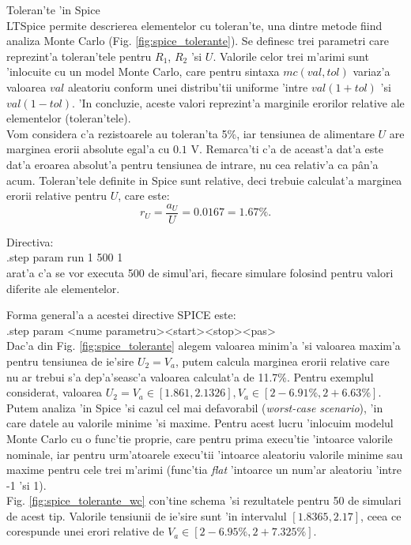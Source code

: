 \begin{definition}[facultativ] Toleran'te 'in Spice\\
LTSpice permite descrierea elementelor cu toleran'te, una dintre metode fiind analiza Monte Carlo (Fig. \ref{fig:spice_tolerante}). Se definesc trei parametri care reprezint'a toleran'tele pentru $R_1$, $R_2$ 'si $U$. Valorile celor trei m'arimi sunt 'inlocuite cu un model Monte Carlo, care pentru sintaxa $mc(val,tol)$ variaz'a valoarea $val$ aleatoriu conform unei distribu'tii uniforme 'intre $val(1+tol)$ 'si $val(1-tol)$. 'In concluzie, aceste valori reprezint'a marginile erorilor relative ale elementelor (toleran'tele).\\

Vom considera c'a rezistoarele au toleran'ta 5\%, iar tensiunea de alimentare $U$ are marginea erorii absolute egal'a cu $0.1$ V. Remarca'ti c'a de aceast'a dat'a este dat'a eroarea absolut'a pentru tensiunea de intrare, nu cea relativ'a ca p\^an'a acum. Toleran'tele definite in Spice sunt relative, deci trebuie calculat'a marginea erorii relative pentru $U$, care este:
\begin{equation*} 
r_U = \frac{a_U}{U} = 0.0167 = 1.67\%.
\end{equation*}

Directiva:\\
.step param run 1 500 1 \\
arat'a c'a se vor executa 500 de simul'ari, fiecare simulare folosind pentru valori diferite ale elementelor. 

Forma general'a a acestei directive SPICE este: \\
.step param \textless nume parametru\textgreater \textless start\textgreater \textless stop\textgreater \textless pas\textgreater\\

Dac'a din Fig. \ref{fig:spice_tolerante} alegem valoarea minim'a 'si valoarea maxim'a pentru tensiunea de ie'sire $U_2 = V_a$, putem calcula marginea erorii relative care nu ar trebui s'a dep'a'seasc'a valoarea calculat'a de 11.7\%.
Pentru exemplul considerat, valoarea $U_2 = V_a \in [1.861, 2.1326], V_a \in \left[2-6.91\%, 2+6.63\%\right]$.\\

Putem analiza 'in Spice 'si cazul cel mai defavorabil (\textit{worst-case scenario}), 'in care datele au valorile minime 'si maxime. Pentru acest lucru 'inlocuim modelul Monte Carlo cu o func'tie proprie, care pentru prima execu'tie 'intoarce valorile nominale, iar pentru urm'atoarele execu'tii 'intoarce aleatoriu valorile minime sau maxime pentru cele trei m'arimi (func'tia \textit{flat} 'intoarce un num'ar aleatoriu 'intre -1 'si 1).\\

Fig. \ref{fig:spice_tolerante_wc} con'tine schema 'si rezultatele pentru 50 de simulari de acest tip. Valorile tensiunii de ie'sire sunt 'in intervalul $[1.8365, 2.17]$, ceea ce corespunde unei erori relative de $V_a \in \left[2-6.95\%, 2+7.325\%\right]$.
\end{definition} 

